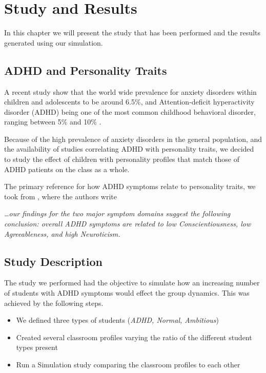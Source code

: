 \chapter{Study and Results}
In this chapter we will present the study that has been performed and the results
generated using our simulation.

\section{ADHD and Personality Traits}
A recent study \cite{Polanczyk2015} show that the world wide prevalence
for anxiety disorders within children and adolescents to be around 6.5\%, and 
Attention-deficit hyperactivity disorder (ADHD)\cite{Barkley1997} being one
of the most common childhood behavioral disorder, ranging between 5\% and 10\% \cite{Sayal2018}.

\bb

Because of the high prevalence of anxiety disorders in the general population,
and the availability of studies correlating ADHD with personality traits, we
decided to study the effect of children with personality profiles that match those
of ADHD patients on the class as a whole.

\bb

The primary reference for how ADHD symptoms relate to personality traits, we took
from \cite{Nigg2002}, where the authors write

\textit{\dots our findings for the two major symptom domains suggest the following
conclusion: overall ADHD symptoms are related to low Conscientiousness, low Agreeableness, and high Neuroticism.}

\section{Study Description}
The study we performed had the objective to simulate how an increasing number of
students with ADHD symptoms would effect the group dynamics. This was achieved by
the following steps.

\begin{itemize}
    \item We defined three types of students (\textit{ADHD, Normal, Ambitious})
    \item Created several classroom profiles varying the ratio of the different student types present
    \item Run a Simulation study comparing the classroom profiles to each other
\end{itemize}

